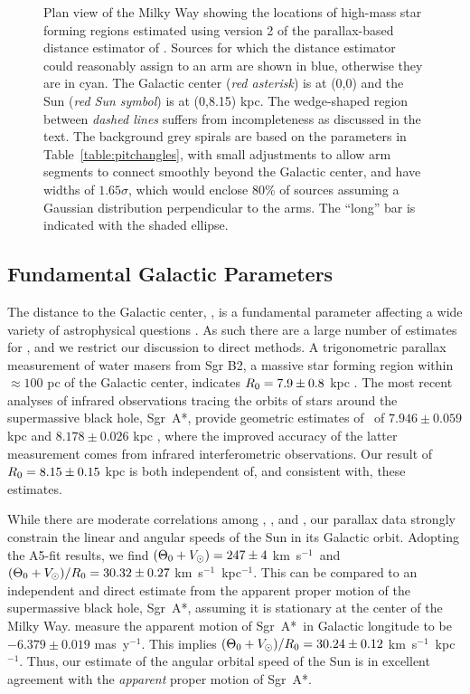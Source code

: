 \documentclass[12pt,preprint]{aastex}
\def\SgrA {Sgr~A*}
\def\kms  {km~s$^{-1}$}
\def\kmsperkpc {km~s$^{-1}$~kpc$^{-1}$}
\def\masy {mas~y$^{-1}$}
\def\eg   {e.g.,~}
\def\V     {\ifmmode {V_\odot}\else {$V_\odot$}\fi}
\def\To    {\ifmmode{\Theta_0}\else{$\Theta_0$}\fi}
\def\Ro    {\ifmmode{R_0}\else{$R_0$}\fi}
\begin{document}
\begin{figure}[htp]
\caption{\small 
Plan view of the Milky Way showing the locations of high-mass star forming regions 
estimated using version 2 of the parallax-based distance estimator of \citet{Reid:16}.  
Sources for which the distance estimator could reasonably assign to an arm are shown in blue,
otherwise they are in cyan.  The Galactic center ({\it red asterisk}) is at (0,0) and 
the Sun ({\it red Sun symbol}) is at (0,8.15) kpc.  The wedge-shaped region between 
{\it dashed lines} suffers from incompleteness as discussed in the text.
The background grey spirals are based on 
the parameters in Table~\ref{table:pitchangles}, with small adjustments to allow arm segments to 
connect smoothly beyond the Galactic center, and have widths of $1.65\sigma$, which would 
enclose 80\% of sources assuming a Gaussian distribution perpendicular to the arms.  
The ``long'' bar is indicated with the shaded ellipse.  
        } 
\label{fig:Bayesian_map}
\end{figure}


\subsection{Fundamental Galactic Parameters}

The distance to the Galactic center, \Ro, is a fundamental parameter affecting
a wide variety of astrophysical questions \citep[\eg][]{Reid:93}.  As such 
there are a large number of estimates for \Ro, and we restrict our discussion
to direct methods.  A trigonometric parallax measurement of water masers from
Sgr B2, a massive star forming region within $\approx100$ pc of the Galactic center,
indicates $\Ro = 7.9\pm0.8$ kpc \citep{Reid:09c}.  The most recent analyses of 
infrared observations tracing the orbits of stars around the supermassive black hole, 
\SgrA, provide geometric estimates of \Ro\ of $7.946\pm0.059$ kpc \citep{Do:19}  
and $8.178\pm0.026$ kpc \citep{Gravity:19}, where the improved accuracy of the latter 
measurement comes from infrared interferometric observations.  
Our result of $\Ro=8.15\pm0.15$ kpc is both independent of, and consistent with, 
these estimates.  

While there are moderate correlations among \Ro, \To, and \V, our parallax data 
strongly constrain the linear and angular speeds of the Sun in its Galactic orbit.  
Adopting the A5-fit results, we find $(\To+\V)=247\pm4$ \kms\ and 
$(\To+\V)/\Ro = 30.32\pm0.27$ \kms\ kpc$^{-1}$.  
This can be compared to an independent and direct estimate from the apparent proper 
motion of the supermassive black hole, \SgrA, assuming it is stationary at the
center of the Milky Way.  \citet{Reid:04} measure the apparent 
motion of \SgrA\ in Galactic longitude to be $-6.379\pm0.019$ \masy.  
This implies $(\To+\V)/\Ro = 30.24\pm0.12$ \kmsperkpc.  Thus, our 
estimate of the angular orbital speed of the Sun is in excellent agreement with
the {\it apparent} proper motion of \SgrA.
\end{document}
